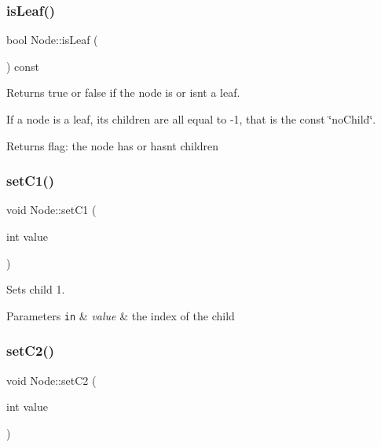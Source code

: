 \subsubsection{\texorpdfstring{is\+Leaf()}{isLeaf()}}
{\footnotesize\ttfamily bool Node\+::is\+Leaf (\begin{DoxyParamCaption}{ }\end{DoxyParamCaption}) const}



Returns true or false if the node is or isn\textquotesingle{}t a leaf. 

If a node is a leaf, its children are all equal to -\/1, that is the const \char`\"{}no\+Child\char`\"{}.

\begin{DoxyReturn}{Returns}
flag\+: the node has or hasn\textquotesingle{}t children 
\end{DoxyReturn}
\mbox{\label{classNode_ad6d91049f0851255bb064836405067be}} 
\subsubsection{\texorpdfstring{set\+C1()}{setC1()}}
{\footnotesize\ttfamily void Node\+::set\+C1 (\begin{DoxyParamCaption}\item[{int}]{value }\end{DoxyParamCaption})}



Sets child 1. 


\begin{DoxyParams}[1]{Parameters}
\mbox{\tt in}  & {\em value} & the index of the child \\
\hline
\end{DoxyParams}
\mbox{\label{classNode_aec5c9d9903b33dbb1bfef5b5dd351a49}} 
\subsubsection{\texorpdfstring{set\+C2()}{setC2()}}
{\footnotesize\ttfamily void Node\+::set\+C2 (\begin{DoxyParamCaption}\item[{int}]{value }\end{DoxyParamCaption})}



